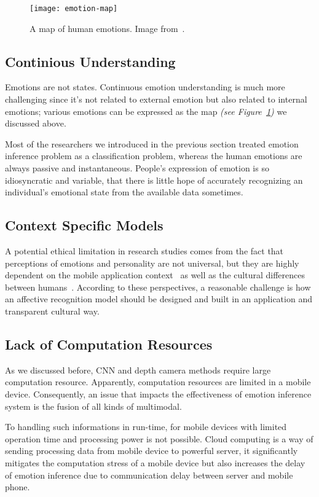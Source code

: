 \begin{figure}[htb]
    \centering
    \texttt{[image: emotion-map]}
    \caption{A map of human emotions. Image from~\cite{emotionmap}.}
    \label{fig:emotions}
\end{figure}


\subsection{Continious Understanding}

Emotions are not states. Continuous emotion understanding is much more challenging since it's not related to external emotion but also related to internal emotions; various emotions can be expressed as the map \textit{(see Figure~\ref{fig:emotions})} we discussed above.

Most of the researchers we introduced in the previous section treated emotion inference problem as a classification problem, whereas the human emotions are always passive and instantaneous. People's expression of emotion is so idiosyncratic and variable, that there is little hope of accurately recognizing an individual’s emotional state from the available data sometimes.

\subsection{Context Specific Models}

A potential ethical limitation in research studies comes from the fact that perceptions of emotions and personality are not universal, but they are highly dependent on the mobile application context~\cite{Gao2012, Shah2015, bhattacharya2017predictive, Tikadar2017} as well as the cultural differences between humans~\cite{mesquita1992cultural, masuda2008placing, gendron2014perceptions}. According to these perspectives, a reasonable challenge is how an affective recognition model should be designed and built in an application and transparent cultural way.

\subsection{Lack of Computation Resources}

As we discussed before, CNN and depth camera methods require large computation resource. 
Apparently, computation resources are limited in a mobile device. Consequently, an issue that impacts the effectiveness of emotion inference system is the fusion of all kinds of multimodal.

To handling such informations in run-time, for mobile devices with limited operation time and processing power is not possible. Cloud computing is a way of sending processing data from mobile device to powerful server, it significantly mitigates the computation stress of a mobile device but also increases the delay of emotion inference due to communication delay between server and mobile phone.
